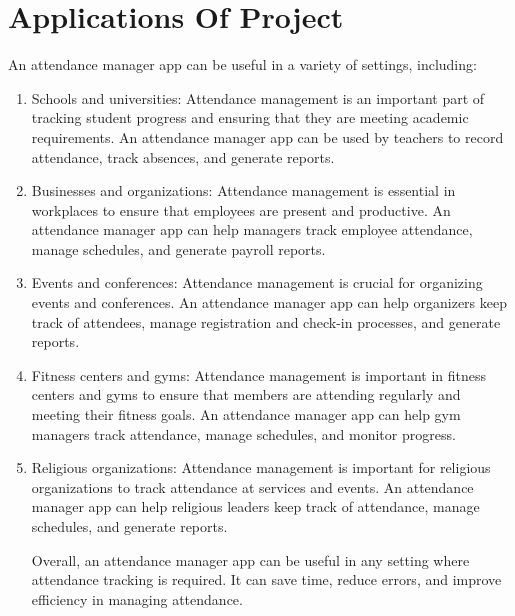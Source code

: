 \documentclass{article}
\begin{document}
\section{Applications Of Project}
{\fontsize{14}{14}\selectfont
An attendance manager app can be useful in a variety of settings, including:
\begin{enumerate}
   \item Schools and universities: Attendance management is an important part of tracking student progress and ensuring that they are meeting academic requirements. An attendance manager app can be used by teachers to record attendance, track absences, and generate reports.

  \item Businesses and organizations: Attendance management is essential in workplaces to ensure that employees are present and productive. An attendance manager app can help managers track employee attendance, manage schedules, and generate payroll reports.

  \item Events and conferences: Attendance management is crucial for organizing events and conferences. An attendance manager app can help organizers keep track of attendees, manage registration and check-in processes, and generate reports.

  \item Fitness centers and gyms: Attendance management is important in fitness centers and gyms to ensure that members are attending regularly and meeting their fitness goals. An attendance manager app can help gym managers track attendance, manage schedules, and monitor progress.

  \item Religious organizations: Attendance management is important for religious organizations to track attendance at services and events. An attendance manager app can help religious leaders keep track of attendance, manage schedules, and generate reports.

Overall, an attendance manager app can be useful in any setting where attendance tracking is required. It can save time, reduce errors, and improve efficiency in managing attendance.
\end{enumerate}}
\newpage
\end{document}
